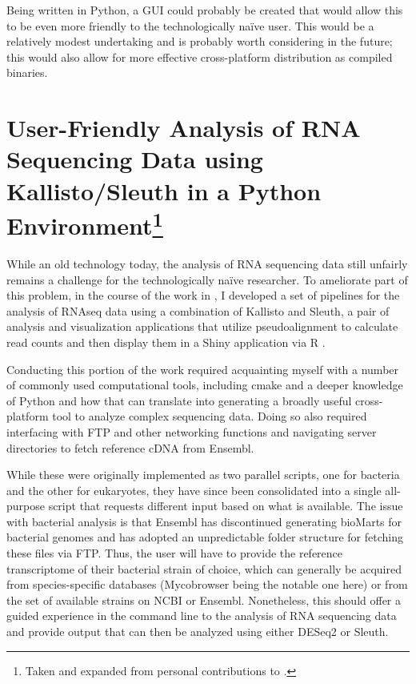 Being written in Python, a GUI could probably be created that would allow this to be even more friendly to the technologically na\"{i}ve user. This would be a relatively modest undertaking and is probably worth considering in the future; this would also allow for more effective cross-platform distribution as compiled binaries.

\section[User-Friendly Analysis of RNA Sequencing Data using Kallisto/Sleuth in a Python Environment]{User-Friendly Analysis of RNA Sequencing Data using Kallisto/Sleuth in a Python Environment\footnote{Taken and expanded from personal contributions to .}}\label{rnaseq}

While an old technology today, the analysis of RNA sequencing data still unfairly remains a challenge for the technologically na\"{i}ve researcher. To ameliorate part of this problem, in the course of the work in \citet{Saelens2022}, I developed a set of pipelines for the analysis of RNAseq data using a combination of Kallisto and Sleuth, a pair of analysis and visualization applications that utilize pseudoalignment to calculate read counts and then display them in a Shiny application via R \citep{Pimentel2017}.

Conducting this portion of the work required acquainting myself with a number of commonly used computational tools, including cmake and a deeper knowledge of Python and how that can translate into generating a broadly useful cross-platform tool to analyze complex sequencing data. Doing so also required interfacing with FTP and other networking functions and navigating server directories to fetch reference cDNA from Ensembl.

While these were originally implemented as two parallel scripts, one for bacteria and the other for eukaryotes, they have since been consolidated into a single all-purpose script that requests different input based on what is available. The issue with bacterial analysis is that Ensembl has discontinued generating bioMarts for bacterial genomes and has adopted an unpredictable folder structure for fetching these files via FTP. Thus, the user will have to provide the reference transcriptome of their bacterial strain of choice, which can generally be acquired from species-specific databases (Mycobrowser being the notable one here) or from the set of available strains on NCBI or Ensembl. Nonetheless, this should offer a guided experience in the command line to the analysis of RNA sequencing data and provide output that can then be analyzed using either DESeq2 or Sleuth.

